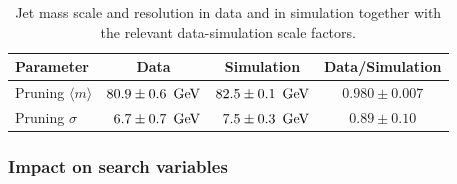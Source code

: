 \begin{table}[!htb]
 \begin{center}

 \begin{tabular}{|l|c|c|c}
  Parameter & Data & Simulation & Data/Simulation \\
  \hline
  Pruning $\langle m \rangle$ &$80.9 \pm 0.6~{\rm \,\text{Ge\hspace{-.08em}V}}$   & $82.5 \pm 0.1~{\rm \,\text{Ge\hspace{-.08em}V}}$  & $0.980 \pm 0.007$ \\
  Pruning $\sigma$            & \ $6.7 \pm 0.7~{\rm \,\text{Ge\hspace{-.08em}V}}$ & \ $7.5 \pm 0.3~{\rm \,\text{Ge\hspace{-.08em}V}}$ & $0.89 \pm 0.10$ \\
  \hline
 \end{tabular}
 \caption{Jet mass scale and resolution in data and in simulation together with the relevant data-simulation scale factors.}
 \label{tab:searchI:params}
 \end{center}
\end{table}

\subsubsection{Impact on search variables}
\label{sec:searchI:wtagimpact}

